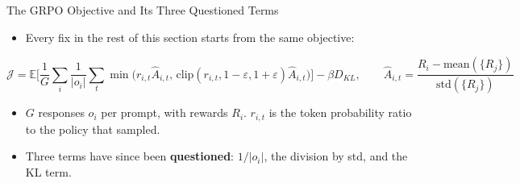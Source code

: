 \begin{frame}{The GRPO Objective and Its Three Questioned Terms}
    \begin{itemize}\itemsep0.35em
        \item Every fix in the rest of this section starts from the same objective:
    \end{itemize}
    {\footnotesize\[
        \mathcal{J}=\mathbb{E}\Big[\frac{1}{G}\sum_{i}\frac{1}{|o_i|}\sum_t\min\big(r_{i,t}\hat A_{i,t},\,\mathrm{clip}(r_{i,t},1-\varepsilon,1+\varepsilon)\hat A_{i,t}\big)\Big]-\beta D_{KL},
        \qquad
        \hat A_{i,t}=\frac{R_i-\mathrm{mean}(\{R_j\})}{\mathrm{std}(\{R_j\})}
    \]}
    \begin{itemize}\itemsep0.35em
        \item $G$ responses $o_i$ per prompt, with rewards $R_i$. $r_{i,t}$ is the token probability ratio to the policy that sampled.
        \item Three terms have since been \textbf{questioned}: $1/|o_i|$, the division by std, and the KL term.
    \end{itemize}
\end{frame}

